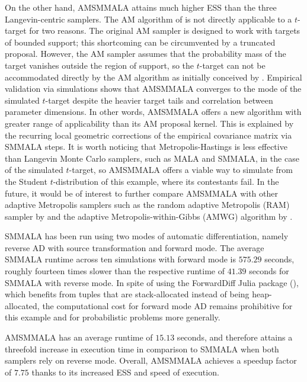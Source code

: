\documentclass[twoside,11pt]{article}
\begin{document}
On the other hand, AMSMMALA attains much higher ESS than the three Langevin-centric samplers. The AM algorithm of 
\cite{haa_sak_tam__ana} is not directly applicable to a $t$-target for two reasons. The original AM sampler is designed to 
work with targets of bounded support; this shortcoming can be circumvented by a truncated proposal. However, the AM sampler 
assumes that the probability mass of the target vanishes outside the region of support, so the $t$-target can not be 
accommodated directly by the AM algorithm as initially conceived by \cite{haa_sak_tam__ana}. Empirical validation via 
simulations shows that AMSMMALA converges to the mode of the simulated $t$-target despite the heavier target tails and 
correlation between parameter dimensions. In other words, AMSMMALA offers a new algorithm with greater range of applicability
than its AM proposal kernel. This is explained by the recurring local geometric corrections of the empirical covariance 
matrix via SMMALA steps. It is worth noticing that Metropolis-Hastings is less effective than Langevin Monte Carlo samplers, 
such as MALA and SMMALA, in the case of the simulated $t$-target, so AMSMMALA offers a viable way to simulate from the 
Student $t$-distribution of this example, where its contestants fail. In the future, it would be of interest to further 
compare AMSMMALA with other adaptive Metropolis samplers such as the random adaptive Metropolis (RAM) sampler by 
\cite{vih__rob} and the adaptive Metropolis-within-Gibbs (AMWG) algorithm by \cite{rob_ros__exa}.

SMMALA has been run using two modes of automatic differentiation, namely reverse AD with source transformation and forward 
mode. The average SMMALA runtime across ten simulations with forward mode is $575.29$ seconds, roughly fourteen times slower
than the respective runtime of $41.39$ seconds for SMMALA with reverse mode. In spite of using the ForwardDiff Julia 
package (\cite{rev_lub_pap__for}), which benefits from tuples that are stack-allocated instead of being heap-allocated, the
computational cost for forward mode AD remains prohibitive for this example and for probabilistic problems more generally.

AMSMMALA has an average runtime of $15.13$ seconds, and therefore attains a threefold increase in execution time in
comparison to SMMALA when both samplers rely on reverse mode. Overall, AMSMMALA achieves a speedup factor of $7.75$ thanks to
its increased ESS and speed of execution.
\end{document}
